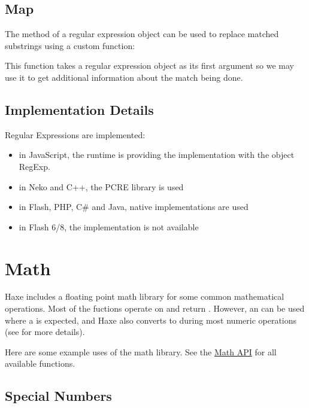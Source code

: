 
\subsection{Map}
\label{std-regex-map}

The  method of a regular expression object can be used to replace matched substrings using a custom function:


This function takes a regular expression object as its first argument so we may use it to get additional information about the match being done.

\subsection{Implementation Details}
\label{std-regex-implementation-details}

Regular Expressions are implemented:

\begin{itemize}
	\item in JavaScript, the runtime is providing the implementation with the object RegExp.
	\item in Neko and C++, the PCRE library is used
	\item in Flash, PHP, C\# and Java, native implementations are used
	\item in Flash 6/8, the implementation is not available
\end{itemize}


\section{Math}
\label{std-math}

Haxe includes a floating point math library for some common mathematical operations.  Most of the fuctions operate on and return .  However, an  can be used where a  is expected, and Haxe also converts  to  during most numeric operations  (see  for more details).

Here are some example uses of the math library.  See the \href{http://api.haxe.org/Math.html}{Math API} for all available functions.


\subsection{Special Numbers}
\label{std-math-special-numbers}

